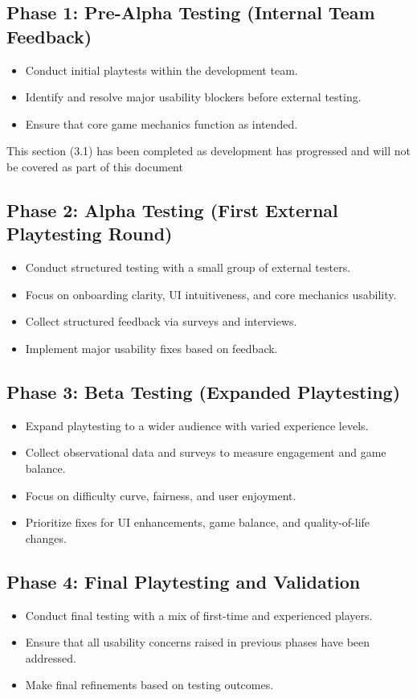 \documentclass[12pt, titlepage]{article}
\begin{document}
\subsection{Phase 1: Pre-Alpha Testing (Internal Team Feedback)}
\begin{itemize}
    \item Conduct initial playtests within the development team.
    \item Identify and resolve major usability blockers before external testing.
    \item Ensure that core game mechanics function as intended.
\end{itemize}
This section (3.1) has been completed as development has progressed and will not be covered as part of this document

\subsection{Phase 2: Alpha Testing (First External Playtesting Round)}
\begin{itemize}
    \item Conduct structured testing with a small group of external testers.
    \item Focus on onboarding clarity, UI intuitiveness, and core mechanics usability.
    \item Collect structured feedback via surveys and interviews.
    \item Implement major usability fixes based on feedback.
\end{itemize}

\subsection{Phase 3: Beta Testing (Expanded Playtesting)}
\begin{itemize}
    \item Expand playtesting to a wider audience with varied experience levels.
    \item Collect observational data and surveys to measure engagement and game balance.
    \item Focus on difficulty curve, fairness, and user enjoyment.
    \item Prioritize fixes for UI enhancements, game balance, and quality-of-life changes.
\end{itemize}

\subsection{Phase 4: Final Playtesting and Validation}
\begin{itemize}
    \item Conduct final testing with a mix of first-time and experienced players.
    \item Ensure that all usability concerns raised in previous phases have been addressed.
    \item Make final refinements based on testing outcomes.
\end{itemize}
\end{document}
